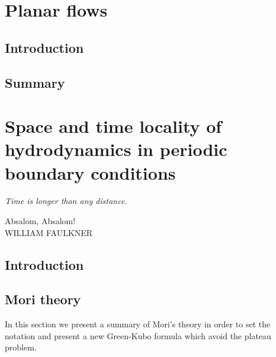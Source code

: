 \documentclass[a4paper,openright,12pt]{book}
\begin{document}
\chapter{Planar flows}\label{Chap:Planar}
\section{Introduction}
\section{Summary}

\chapter{Space and time locality of hydrodynamics in periodic boundary conditions}\label{Chap:PBC}
\epigraph{\textit{Time is longer than any distance.}}{Absalom, Absalom! \\ WILLIAM FAULKNER}
\section{Introduction}



\section{Mori theory}
\label{Sec:Mori}
In this section we present a summary of Mori's theory in order to
set the notation and present a new Green-Kubo formula which avoid the plateau problem. 
\end{document}
